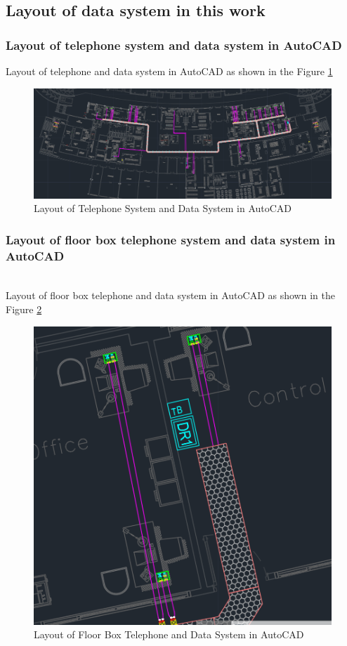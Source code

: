 \documentclass[12pt,fleqn]{book} %
\begin{document}
\subsection{Layout of data system in this work}
\subsubsection{Layout of telephone system and data system in AutoCAD}
Layout of telephone and data system in AutoCAD as shown in the Figure \ref{fig:hamdy new 1}
\begin{figure}[!h]
    \centering
    \includegraphics[width=1\linewidth]{hamdy new 1.png}
    \caption{Layout of Telephone System and Data System in AutoCAD}
    \label{fig:hamdy new 1}
    \end{figure}
\subsubsection{Layout of floor box telephone system and data system in AutoCAD}
\\ Layout of floor box telephone and data system in AutoCAD as shown in the Figure \ref{fig:hamdy new 2}
\begin{figure}[!h]
    \centering
    \includegraphics[width=0.5\linewidth]{hamdy new 2.png}
    \caption{Layout of Floor Box Telephone and Data System in AutoCAD}
    \label{fig:hamdy new 2}
    \end{figure}
\end{document}
